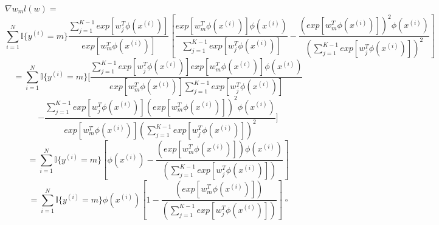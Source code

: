 \documentclass[12 pt]{article}        	%
\begin{document}
$ \nabla w_m l (w) = $
\[
  \sum_{i=1}^{N} \mathbb{I} \{ y^{(i)} = m \} 
  \frac{ \sum_{j=1}^{K-1} exp[ w_{j}^{T} \phi(x^{(i)}) ] }{ exp[ w_{m}^{T} \phi(x^{(i)}) ] }
  [
    \frac{
      exp[ w_{m}^{T} \phi(x^{(i)}) ] \phi(x^{(i)})
    }{
      \sum_{j=1}^{K-1} exp[ w_{j}^{T} \phi(x^{(i)}) ]
    }
    - \frac{
      ( exp[ w_{m}^{T} \phi(x^{(i)}) ] )^2 \phi(x^{(i)})
    }{
      ( \sum_{j=1}^{K-1} exp[ w_{j}^{T} \phi(x^{(i)}) ] )^2
    }
  ]
\]
\[
  = \sum_{i=1}^{N} \mathbb{I} \{ y^{(i)} = m \} 
  [
    \frac{
      \sum_{j=1}^{K-1} exp[ w_{j}^{T} \phi(x^{(i)}) ] exp[ w_{m}^{T} \phi(x^{(i)}) ] \phi(x^{(i)}) 
    }{
      exp[ w_{m}^{T} \phi(x^{(i)}) ] \sum_{j=1}^{K-1} exp[ w_{j}^{T} \phi(x^{(i)}) ]
    }
\]
\[
    - \frac{
      \sum_{j=1}^{K-1} exp[ w_{j}^{T} \phi(x^{(i)}) ]
      ( exp[ w_{m}^{T} \phi(x^{(i)}) ] )^2 \phi(x^{(i)})
    }{
      exp[ w_{m}^{T} \phi(x^{(i)}) ]
      ( \sum_{j=1}^{K-1} exp[ w_{j}^{T} \phi(x^{(i)}) ] )^2
    }
  ]
\]
\[
= \sum_{i=1}^{N} \mathbb{I} \{ y^{(i)} = m \}
[
  \phi(x^{(i)})
    - \frac{
      ( exp[ w_{m}^{T} \phi(x^{(i)}) ] ) \phi(x^{(i)})
    }{
      ( \sum_{j=1}^{K-1} exp[ w_{j}^{T} \phi(x^{(i)}) ] )
    }
]
\]
\[
= \sum_{i=1}^{N} \mathbb{I} \{ y^{(i)} = m \} \phi(x^{(i)})
[
  1 
  - \frac{
      ( exp[ w_{m}^{T} \phi(x^{(i)}) ] )
    }{
      ( \sum_{j=1}^{K-1} exp[ w_{j}^{T} \phi(x^{(i)}) ] )
    }
] \; \square
\]
\newpage
\end{document}
